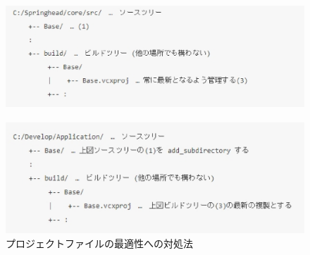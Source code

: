 \begin{narrow}[20pt]
	\begin{figure}[h]
	    \begin{center}
	    \includegraphics[width=.85\textwidth]{fig/ApproachToProjfileOptimization-1.eps}
	    \end{center}
	\end{figure}
	\begin{figure}[h]
	    \begin{center}
	    \includegraphics[width=.85\textwidth]{fig/ApproachToProjfileOptimization-2.eps}
	    \end{center}
	    \caption{プロジェクトファイルの最適性への対処法}
	    \label{fig:ApproachToProjfileOptimization}
	\end{figure}
\end{narrow}

